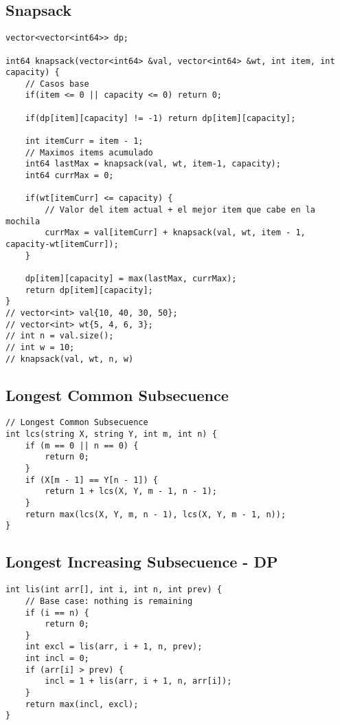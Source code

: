 \documentclass[10pt,letterpaper,twocolumn,twosided]{article}
\begin{document}
\subsection{Snapsack}
\begin{lstlisting}
vector<vector<int64>> dp;

int64 knapsack(vector<int64> &val, vector<int64> &wt, int item, int capacity) {
    // Casos base
    if(item <= 0 || capacity <= 0) return 0;

    if(dp[item][capacity] != -1) return dp[item][capacity];
    
    int itemCurr = item - 1;
    // Maximos items acumulado
    int64 lastMax = knapsack(val, wt, item-1, capacity);
    int64 currMax = 0;

    if(wt[itemCurr] <= capacity) {
        // Valor del item actual + el mejor item que cabe en la mochila
        currMax = val[itemCurr] + knapsack(val, wt, item - 1, capacity-wt[itemCurr]);
    }

    dp[item][capacity] = max(lastMax, currMax);
    return dp[item][capacity];
}
// vector<int> val{10, 40, 30, 50};
// vector<int> wt{5, 4, 6, 3};
// int n = val.size();
// int w = 10;
// knapsack(val, wt, n, w)
\end{lstlisting}

\subsection{Longest Common Subsecuence}
\begin{lstlisting}
// Longest Common Subsecuence
int lcs(string X, string Y, int m, int n) {
    if (m == 0 || n == 0) {
        return 0;
    }
    if (X[m - 1] == Y[n - 1]) {
        return 1 + lcs(X, Y, m - 1, n - 1);
    }
    return max(lcs(X, Y, m, n - 1), lcs(X, Y, m - 1, n));
}
\end{lstlisting}

\subsection{Longest Increasing Subsecuence - DP}
\begin{lstlisting}
int lis(int arr[], int i, int n, int prev) {
    // Base case: nothing is remaining
    if (i == n) {
        return 0;
    }
    int excl = lis(arr, i + 1, n, prev); 
    int incl = 0;
    if (arr[i] > prev) {
        incl = 1 + lis(arr, i + 1, n, arr[i]);
    }
    return max(incl, excl);
}
\end{lstlisting}
\end{document}
